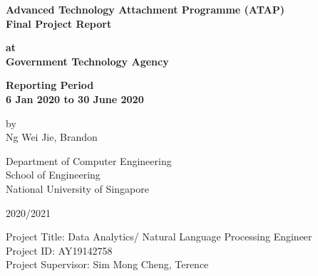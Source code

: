 \begin{titlepage}
	\begin{center}
		\vspace*{20px}
		\large\textbf{Advanced Technology Attachment Programme (ATAP)}\\
		\large\textbf{Final Project Report}
		
		\vspace*{50px}
		\large\textbf{at}\\
		\large\textbf{Government Technology Agency}
		
		\vspace*{20px}
		\large\textbf{Reporting Period}\\
		\large\textbf{6 Jan 2020 to 30 June 2020}
		
		\vspace*{20px}
		\large{by}\\
		\large{Ng Wei Jie, Brandon}
		
		\vspace*{20px}
		\large{Department of Computer Engineering}\\
		\large{School of Engineering}\\
		\large{National University of Singapore}
		
		\vspace*{20px}
		\large{2020/2021}
	\end{center}

	\begin{large}
		\vspace*{50px}
		\noindent 
		Project Title: Data Analytics/ Natural Language Processing Engineer\\
		Project ID: AY19142758\\
		Project Supervisor: Sim Mong Cheng, Terence\\
	\end{large}
\end{titlepage}